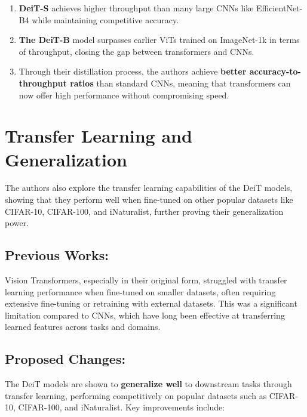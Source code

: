 \documentclass{report}
\begin{document}
	\begin{enumerate}
		\item 
		\textbf{DeiT-S} achieves higher throughput than many large CNNs like EfficientNet-B4 while maintaining competitive accuracy.
		
		\item 
		\textbf{The DeiT-B} model surpasses earlier ViTs trained on ImageNet-1k in terms of throughput, closing the gap between transformers and CNNs.
		
		\item 
		Through their distillation process, the authors achieve \textbf{better accuracy-to-throughput ratios} than standard CNNs, meaning that transformers can now offer high performance without compromising speed.
	\end{enumerate}
	
	
	
	\section{Transfer Learning and Generalization}
	The authors also explore the transfer learning capabilities of the DeiT models, showing that they perform well when fine-tuned on other popular datasets like CIFAR-10, CIFAR-100, and iNaturalist, further proving their generalization power.
	
	\subsection{Previous Works:}
	Vision Transformers, especially in their original form, struggled with transfer learning performance when fine-tuned on smaller datasets, often requiring extensive fine-tuning or retraining with external datasets. This was a significant limitation compared to CNNs, which have long been effective at transferring learned features across tasks and domains.
	
	
	\subsection{Proposed Changes:}
	The DeiT models are shown to \textbf{generalize well} to downstream tasks through transfer learning, performing competitively on popular datasets such as CIFAR-10, CIFAR-100, and iNaturalist. Key improvements include:
	
\end{document}
